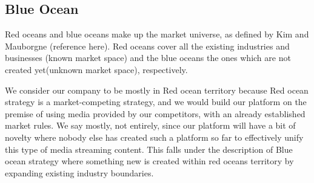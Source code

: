 \subsection{Blue Ocean}

Red oceans and blue oceans make up the market universe, as defined by Kim and Mauborgne (reference here). Red oceans cover all the existing industries and businesses (known market space) and the blue oceans the ones which are not created yet(unknown market space), respectively.

We consider our company to be mostly in Red ocean territory because Red ocean strategy is a market-competing strategy, and we would build our platform on the premise of using media provided by our competitors, with an already established market rules. We say mostly, not entirely, since our platform will have a bit of novelty where nobody else  has created such a platform so far to effectively unify this type of media streaming content. This falls under the description of Blue ocean strategy where something new is created within red oceans territory by expanding existing industry boundaries.